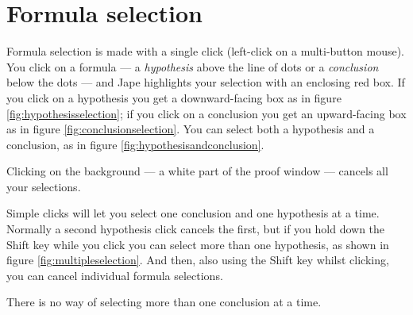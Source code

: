 \documentclass[11pt]{book}
\newcommand{\figref}[1]{figure \ref{fig:#1}}
\begin{document}
\section{Formula selection}
\label{sec:formulaselection}

Formula selection is made with a single click (left-click on a multi-button mouse). You click on a formula --- a \emph{hypothesis} above the line of dots or a \emph{conclusion} below the dots --- and Jape highlights your selection with an enclosing red box. If you click on a hypothesis you get a downward-facing box as in \figref{hypothesisselection}; if you click on a conclusion you get an upward-facing box as in \figref{conclusionselection}. You can select both a hypothesis and a conclusion, as in \figref{hypothesisandconclusion}.

Clicking on the background --- a white part of the proof window --- cancels all your selections.

Simple clicks will let you select one conclusion and one hypothesis at a time. Normally a second hypothesis click cancels the first, but if you hold down the Shift key while you click you can select more than one hypothesis, as shown in \figref{multipleselection}. And then, also using the Shift key whilst clicking, you can cancel individual formula selections.

There is no way of selecting more than one conclusion at a time.
\end{document}
